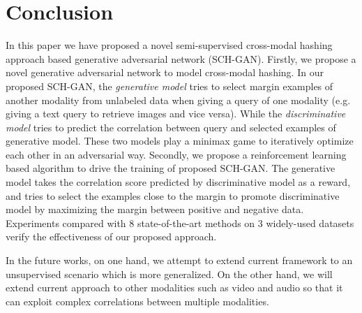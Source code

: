 \documentclass[journal]{IEEEtran}
\begin{document}
\section{Conclusion}
In this paper we have proposed a novel semi-supervised cross-modal hashing approach based generative adversarial network (SCH-GAN). Firstly, we propose a novel generative adversarial network to model cross-modal hashing. In our proposed SCH-GAN, the \textit{generative model} tries to select margin examples of another modality from unlabeled data when giving a query of one modality (e.g. giving a text query to retrieve images and vice versa). While the \textit{discriminative model} tries to predict the correlation between query and selected examples of generative model. These two models play a minimax game to iteratively optimize each other in an adversarial way.
Secondly, we propose a reinforcement learning based algorithm to drive the training of proposed SCH-GAN. The generative model takes the correlation score predicted by discriminative model as a reward, and tries to select the examples close to the margin to promote discriminative model by maximizing the margin between positive and negative data. Experiments compared with 8 state-of-the-art methods on 3 widely-used datasets verify the effectiveness of our proposed approach.

In the future works, on one hand, we attempt to extend current framework to an unsupervised scenario which is more generalized. On the other hand, we will extend current approach to other modalities such as video and audio so that it can exploit complex correlations between multiple modalities.

\ifCLASSOPTIONcaptionsoff
  \newpage
\fi







%
\end{document}
